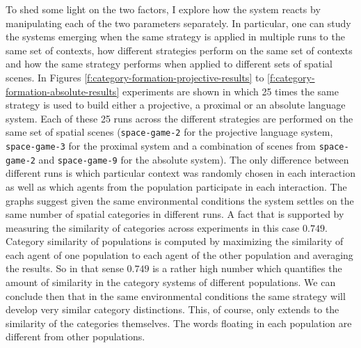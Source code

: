 To shed some light on the two factors, I explore how the
system reacts by manipulating each of the two parameters separately. In particular,
one can study the systems emerging when the same strategy is applied in multiple runs
to the same set of contexts, how different strategies perform on the same set of contexts 
and how the same strategy performs when applied to different sets of spatial scenes. 
In Figures \ref{f:category-formation-projective-results} to \ref{f:category-formation-absolute-results} 
experiments are shown in which 25 times the same strategy is used to build either a
projective, a proximal or an absolute language system. Each of these 25 runs across the 
different strategies are performed on the same set of spatial scenes ({\footnotesize\tt space-game-2} 
for the projective language system, {\footnotesize\tt space-game-3} for the proximal system and a
combination of scenes from {\footnotesize\tt space-game-2} and {\footnotesize\tt space-game-9} for the absolute
system).  The only difference between different runs is which particular context was
randomly chosen in each interaction as well as which agents from the population participate
in each interaction. The graphs suggest given the same environmental conditions 
the system settles on the same number of spatial categories in different runs. A fact that is supported by measuring
the similarity of categories across experiments in this case $0.749$. Category similarity of 
populations is computed by maximizing the similarity of each agent of one population to each
agent of the other population and averaging the results. So in that sense $0.749$ is a rather high
number which quantifies the amount of similarity in the category systems of different
populations. We can conclude then that in the same environmental conditions the 
same strategy will develop very similar category distinctions. This, of course, only extends 
to the similarity of the categories themselves. The words floating in each population are different from 
other populations.

